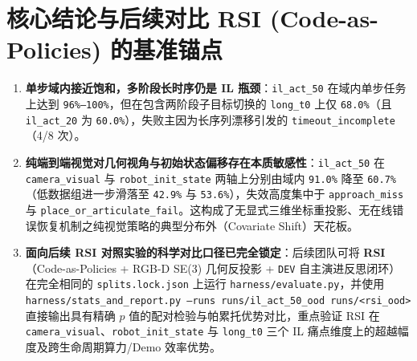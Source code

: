 \documentclass[11pt,a4paper]{article}
\begin{document}
\section{核心结论与后续对比 RSI (Code-as-Policies) 的基准锚点}

\begin{enumerate}[leftmargin=1.6em,itemsep=3pt]
  \item \textbf{单步域内接近饱和，多阶段长时序仍是 IL 瓶颈}：\texttt{il\_act\_50} 在域内单步任务上达到 \texttt{96\%--100\%}，但在包含两阶段子目标切换的 \texttt{long\_t0} 上仅 \texttt{68.0\%}（且 \texttt{il\_act\_20} 为 \texttt{60.0\%}），失败主因为长序列漂移引发的 \texttt{timeout\_incomplete}（4/8 次）。
  \item \textbf{纯端到端视觉对几何视角与初始状态偏移存在本质敏感性}：\texttt{il\_act\_50} 在 \texttt{camera\_visual} 与 \texttt{robot\_init\_state} 两轴上分别由域内 \texttt{91.0\%} 降至 \texttt{60.7\%}（低数据组进一步滑落至 \texttt{42.9\%} 与 \texttt{53.6\%}），失效高度集中于 \texttt{approach\_miss} 与 \texttt{place\_or\_articulate\_fail}。这构成了无显式三维坐标重投影、无在线错误恢复机制之纯视觉策略的典型分布外（Covariate Shift）天花板。
  \item \textbf{面向后续 RSI 对照实验的科学对比口径已完全锁定}：后续团队可将 \textbf{RSI}（Code-as-Policies + RGB-D SE(3) 几何反投影 + \texttt{DEV} 自主演进反思闭环）在完全相同的 \texttt{splits.lock.json} 上运行 \texttt{harness/evaluate.py}，并使用 \texttt{harness/stats\_and\_report.py --runs runs/il\_act\_50\_ood runs/<rsi\_ood>} 直接输出具有精确 $p$ 值的配对检验与帕累托优势对比，重点验证 RSI 在 \texttt{camera\_visual}、\texttt{robot\_init\_state} 与 \texttt{long\_t0} 三个 IL 痛点维度上的超越幅度及跨生命周期算力/Demo 效率优势。
\end{enumerate}
\end{document}
